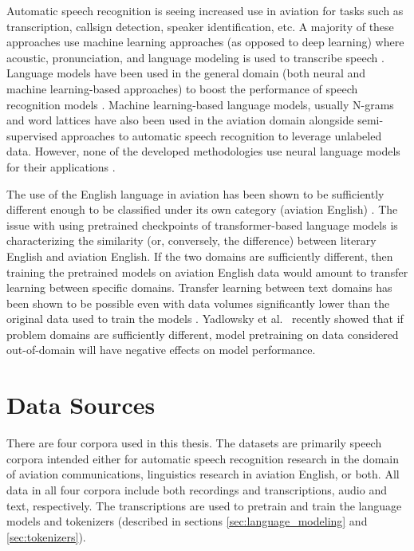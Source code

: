\documentclass[12pt]{article}
\begin{document}
Automatic speech recognition is seeing increased use in aviation for tasks such as transcription, callsign detection, speaker identification,
etc. A majority of these approaches use machine learning approaches (as opposed to deep learning) where acoustic, pronunciation, and language
modeling is used to transcribe speech
\cite{guo_comparative_2022,smidl_air_2019,zuluaga-gomez_automatic_2020,badrinath_automatic_2022,hofbauer_atcosim_2008,helmke_quantifying_2017}.
Language models have been used in the general domain (both neural and machine learning-based approaches) to boost the performance of speech
recognition models \cite{han_contextnet_2020,kriman_quartznet_2020,majumdar_citrinet_2021}. Machine learning-based language models, usually N-grams
and word lattices have also been used in the aviation domain alongside semi-supervised approaches to automatic speech recognition to leverage
unlabeled data. However, none of the developed methodologies use neural language models for their applications
\cite{zuluaga-gomez_contextual_2021,srinivasamurthy_semi-supervised_2017,badrinath_automatic_2022}.

The use of the English language in aviation has been shown to be sufficiently different enough to be classified under its own category (aviation
English) \cite{paltridge_handbook_2013}. The issue with using pretrained checkpoints of transformer-based language models is characterizing the
similarity (or, conversely, the difference) between literary English and aviation English. If the two domains are sufficiently different, then
training the pretrained models on aviation English data would amount to transfer learning between specific domains. Transfer learning between text
domains has been shown to be possible even with data volumes significantly lower than the original data used to train the models
\cite{raffel_exploring_2020}. Yadlowsky et al.~\cite{yadlowsky_pretraining_2023} recently showed that if problem domains are sufficiently different,
model pretraining on data considered out-of-domain will have negative effects on model performance.

\section{Data Sources}\label{sec:data_source}
There are four corpora used in this thesis. The datasets are primarily speech corpora intended either for automatic speech recognition research in the
domain of aviation communications, linguistics research in aviation English, or both. All data in all four corpora include both recordings and
transcriptions, audio and text, respectively. The transcriptions are used to pretrain and train the language models and tokenizers (described in
sections \ref{sec:language_modeling} and \ref{sec:tokenizers}).
\end{document}
